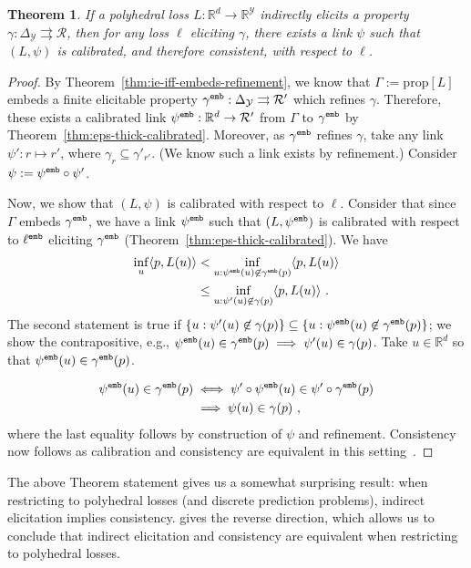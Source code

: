 \documentclass[11pt]{article}
\newcommand{\reals}{\mathbb{R}}
\newcommand{\prop}[1]{\mathrm{prop}[#1]}
\newcommand{\simplex}{\Delta_\Y}
\newcommand{\R}{\mathcal{R}}
\newcommand{\Y}{\mathcal{Y}}
\newcommand{\inprod}[2]{\langle #1, #2 \rangle}%
\newcommand{\toto}{\rightrightarrows}
\newcommand{\emb}{{\tt emb}}
\newtheorem{theorem}{Theorem}
\begin{document}
\begin{theorem}\label{thm:poly-ie-implies-consistent}
	If a polyhedral loss $L:\reals^d \to \reals^\Y$ indirectly elicits a property $\gamma: \simplex \toto \R$, then for any loss $\ell$ eliciting $\gamma$, there exists a link $\psi$ such that $(L, \psi)$ is calibrated, and therefore consistent, with respect to $\ell$.
\end{theorem}
\begin{proof}
	By Theorem~\ref{thm:ie-iff-embeds-refinement}, we know that $\Gamma := \prop{L}$ embeds a finite elicitable property $\gamma^\emb:\simplex \toto \R'$ which refines $\gamma$.
	Therefore, these exists a calibrated link $\psi^\emb : \reals^d \to \R'$ from $\Gamma$ to $\gamma^\emb$ by Theorem~\ref{thm:eps-thick-calibrated}. Moreover, as $\gamma^\emb$ refines $\gamma$, take any link $\psi': r \mapsto r'$, where $\gamma_r \subseteq \gamma'_{r'}$. 
	(We know such a link exists by refinement.)
	Consider $\psi := \psi^\emb \circ \psi'$.
	
	Now, we show that $(L, \psi)$ is calibrated with respect to $\ell$.
	Consider that since $\Gamma$ embeds $\gamma^\emb$, we have a link $\psi^\emb$ such that $(L,\psi^\emb)$ is calibrated with respect to $\ell^\emb$ eliciting $\gamma^\emb$ (Theorem~\ref{thm:eps-thick-calibrated}).
	We have
	\begin{align*}
	\inf_{u}\inprod{p}{L(u)} &< \inf_{u : \psi^\emb(u) \not \in \gamma^\emb(p)} \inprod{p}{L(u)}\\
	&\leq \inf_{u : \psi'(u) \not \in \gamma(p)} \inprod{p}{L(u)}~.~
	\end{align*}
	The second statement is true if $\{u : \psi'(u) \not \in \gamma(p) \} \subseteq \{u : \psi^\emb(u) \not \in \gamma^\emb(p) \}$; we show the contrapositive, e.g., $\psi^\emb(u) \in \gamma^\emb(p) \implies \psi'(u) \in \gamma(p)$.
	Take $u \in \reals^d$ so that $\psi^\emb(u) \in \gamma^\emb(p)$.
	
	\begin{align*}
	\psi^\emb(u) \in \gamma^\emb(p) &\iff \psi' \circ \psi^\emb(u) \in \psi' \circ \gamma^\emb(p)\\
	&\implies \psi(u) \in \gamma(p)~,~
	\end{align*}
	where the last equality follows by construction of $\psi$ and refinement.
	Consistency now follows as calibration and consistency are equivalent in this setting~\citep{bartlett2006convexity}.
\end{proof}

The above Theorem statement gives us a somewhat surprising result: when restricting to polyhedral losses (and discrete prediction problems), indirect elicitation implies consistency.
\citet{finocchiaro2021unifying} gives the reverse direction, which allows us to conclude that indirect elicitation and consistency are equivalent when restricting to polyhedral losses.
\end{document}
